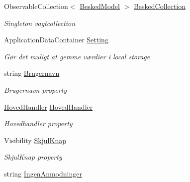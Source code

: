 \begin{DoxyCompactItemize}
\item 
Observable\+Collection$<$ \hyperlink{class__1aarsproeve_1_1_model_1_1_besked_model}{Besked\+Model} $>$ \hyperlink{class__1aarsproeve_1_1_view_model_1_1_hoved_view_model_a098905f543f118e9bf1f6fe5143a4741}{Besked\+Collection}
\begin{DoxyCompactList}\small\item\em Singleton vagtcollection \end{DoxyCompactList}\item 
Application\+Data\+Container \hyperlink{class__1aarsproeve_1_1_view_model_1_1_hoved_view_model_afbb2eb2f33bdb6defe9979b80c6e79ff}{Setting}
\begin{DoxyCompactList}\small\item\em Gør det muligt at gemme værdier i local storage \end{DoxyCompactList}\item 
string \hyperlink{class__1aarsproeve_1_1_view_model_1_1_hoved_view_model_a48f0c876a1e3cd598fe3c4c7c65a760d}{Brugernavn}
\begin{DoxyCompactList}\small\item\em Brugernavn property \end{DoxyCompactList}\item 
\hyperlink{class__1aarsproeve_1_1_handler_1_1_hoved_handler}{Hoved\+Handler} \hyperlink{class__1aarsproeve_1_1_view_model_1_1_hoved_view_model_aaeba819c1330608f58f968d670367c47}{Hoved\+Handler}
\begin{DoxyCompactList}\small\item\em Hovedhandler property \end{DoxyCompactList}\item 
Visibility \hyperlink{class__1aarsproeve_1_1_view_model_1_1_hoved_view_model_ab292f28c3e469ad73d6d6e648f3096f0}{Skjul\+Knap}
\begin{DoxyCompactList}\small\item\em Skjul\+Knap property \end{DoxyCompactList}\item 
string \hyperlink{class__1aarsproeve_1_1_view_model_1_1_hoved_view_model_a358015de6da111dbb14cc14d7a0a421a}{Ingen\+Anmodninger}

\end{DoxyCompactItemize}
